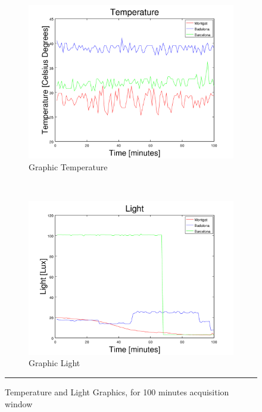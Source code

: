 \documentclass[12pt, a4paper,twoside]{tesi_upf}
\begin{document}
      \begin{figure}[H]
        \centering
        \begin{subfigure}[b]{0.49\textwidth}
                \includegraphics[width=\textwidth]{./Figures/GraphicTemperature.png}
                \caption{Graphic Temperature}
                \label{fig:GraphicTemperature}
        \end{subfigure}%
        ~ %
        \begin{subfigure}[b]{0.49\textwidth}
                \includegraphics[width=\textwidth]{./Figures/GraphicLight.png}
                \caption{Graphic Light}
                \label{fig:GraphicLight}
        \end{subfigure}
        \rule{30em}{0.5pt}
        \caption{Temperature and Light Graphics, for 100 minutes acquisition window}\label{fig:TestbedResults1}
			\end{figure}
\end{document}
